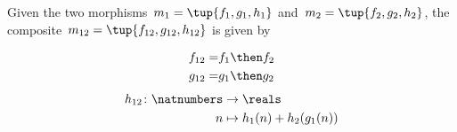{    Given the two morphisms~$m_1 = \tup{f_1, g_1, h_1}$ and~$m_2 = \tup{f_2, g_2, h_2}$, the composite~$m_{12} = \tup{f_{12}, g_{12}, h_{12}}$ is given by

    \begin{eqnarray}
        f_{12} = & f_1 \then f_2 \\
        g_{12} = & g_1 \then g_2 \\
    \end{eqnarray}
    \begin{eqnarray}
        h_{12} \colon \natnumbers & \to \reals                     \\
        n                         & \mapsto h_1(n) + h_2( g_1 (n))
    \end{eqnarray}
}
